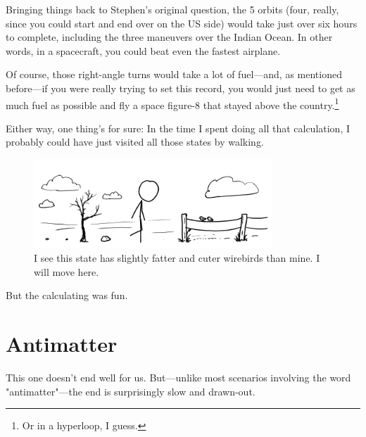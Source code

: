 {{Bringing things back to Stephen's original question, the 5 orbits (four, really, since you could start and end over on the US side) would take just over six hours to complete, including the three maneuvers over the Indian Ocean. In other words, in a spacecraft, you could beat even the fastest airplane.}

{Of course, those right-angle turns would take a lot of fuel—and, as mentioned before—if you were really trying to set this record, you would just need to get as much fuel as possible and fly a space figure-8 that stayed above the country.{\footnote{Or in a hyperloop, I guess.} } }

{Either way, one thing's for sure: In the time I spent doing all that calculation, I probably could have just visited all those states by walking.}

\begin{figure}[!htbp]
\centering
\includegraphics[scale=0.5, max width=0.8\textwidth]{imgs/a/113/walked.png}
\caption{I see this state has slightly fatter and cuter wirebirds than mine. I will move here.}
\end{figure}

{But the calculating was fun.}

{
\chapter{Antimatter}
}

\hfill{}

{This one doesn't end well for us. But—unlike most scenarios involving the word "antimatter"—the end is surprisingly slow and drawn-out.}

}
